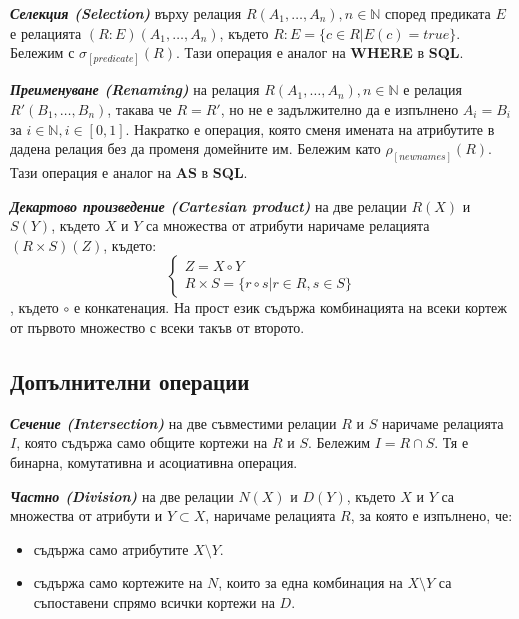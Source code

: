 \documentclass[fleqn,12pt]{article}
\begin{document}
\textbf{\textit{Селекция (Selection)}} върху релация $R(A_1, \dots, A_n), n \in \mathbb{N}$ според предиката $E$ е релацията $(R:E)(A_1, \dots, A_n)$, където $R:E = \{c \in R | E(c) = true\}$.
Бележим с $\sigma_{[predicate]}(R)$.
Тази операция е аналог на \textbf{WHERE} в \textbf{SQL}.
\bigbreak

\textbf{\textit{Преименуване (Renaming)}} на релация $R(A_1, \dots, A_n), n \in \mathbb{N}$ е релация $R'(B_1, \dots, B_n)$, такава че $R = R'$, но не е задължително да е изпълнено $A_i = B_i$ за $i \in \mathbb{N}, i \in [0, 1]$. 
Накратко е операция, която сменя имената на атрибутите в дадена релация без да променя домейните им.
Бележим като $\rho_{[new names]}(R)$.
Тази операция е аналог на \textbf{AS} в \textbf{SQL}.

\textbf{\textit{Декартово произведение (Cartesian product)}} на две релации $R(X)$ и $S(Y)$, където $X$ и $Y$ са множества от атрибути наричаме релацията $(R \times S)(Z)$, където:
\begin{equation}
    \begin{cases}
        Z = X \circ Y\\
        R \times S = \{r \circ s | r \in R, s \in S\}
    \end{cases}
\end{equation}
, където $\circ$ е конкатенация.
На прост език съдържа комбинацията на всеки кортеж от първото множество с всеки такъв от второто.


\subsection{Допълнителни операции}

\textbf{\textit{Сечение (Intersection)}} на две съвместими релации $R$ и $S$ наричаме релацията $I$, която съдържа само общите кортежи на $R$ и $S$.
Бележим $I = R \cap S$.
Тя е бинарна, комутативна и асоциативна операция.
\bigbreak

\textbf{\textit{Частно (Division)}} на две релации $N(X)$ и $D(Y)$, където $X$ и $Y$ са множества от атрибути и $Y \subset X$, наричаме релацията $R$, за която е изпълнено, че:
\begin{itemize}
    \item съдържа само атрибутите $X \setminus Y$.
    \item съдържа само кортежите на $N$, които за една комбинация на $X \setminus Y$ са съпоставени спрямо всички кортежи на $D$.
\end{itemize}
\end{document}
